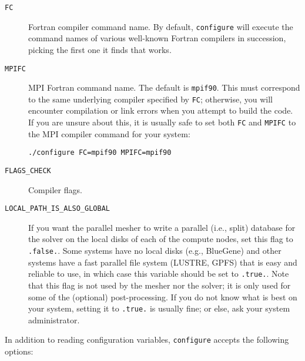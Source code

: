 \begin{description}
\item [{\texttt{FC}}] Fortran compiler command name. By default, \texttt{configure}
will execute the command names of various well-known Fortran compilers
in succession, picking the first one it finds that works.
\item [{\texttt{MPIFC}}] MPI Fortran command name. The default is \texttt{mpif90}.
This must correspond to the same underlying compiler specified by
\texttt{FC}; otherwise, you will encounter compilation or link errors
when you attempt to build the code. If you are unsure about this,
it is usually safe to set both \texttt{FC} and \texttt{MPIFC} to the
MPI compiler command for your system:
\begin{verbatim}
./configure FC=mpif90 MPIFC=mpif90
\end{verbatim}
\end{description}
\begin{description}
\item [{\texttt{FLAGS\_CHECK}}] Compiler flags.
\item [{\texttt{LOCAL\_PATH\_IS\_ALSO\_GLOBAL}}]
If you want the parallel mesher to write a parallel (i.e., split) database for the solver on the
local disks of each of the compute nodes, set this flag to \texttt{.false.}.
Some systems have no local disks
(e.g., BlueGene) and other systems have a fast
parallel file system (LUSTRE, GPFS) that is easy and reliable to use, in which case this variable should be set to
\texttt{.true.}. Note that this flag is not used by the mesher nor
the solver; it is only used for some of the (optional) post-processing.
If you do not know what is best on your system, setting it to \texttt{.true.} is usually fine; or else, ask your system administrator.
\end{description}
In addition to reading configuration variables, \texttt{configure}
accepts the following options:

